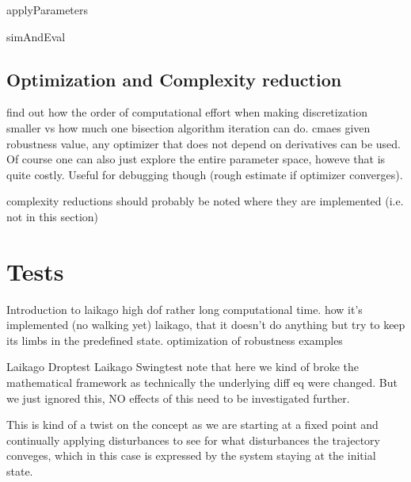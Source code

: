     applyParameters

    simAndEval

\subsection{Optimization and Complexity reduction}
    

    find out how the order of computational effort when making discretization smaller vs how much one bisection algorithm iteration can do. 
    cmaes
    given robustness value, any optimizer that does not depend on derivatives can be used. 
    Of course one can also just explore the entire parameter space, howeve that is quite costly. Useful for debugging though (rough estimate if optimizer converges).

    complexity reductions should probably be noted where they are implemented (i.e. not in this section)

\section{Tests}


    Introduction to laikago
        high dof
        rather long computational time. 
        how it's implemented (no walking yet) laikago, that it doesn't do anything but try to keep its limbs in the predefined state.  
    optimization of robustness examples

    Laikago Droptest
    Laikago Swingtest
        note that here we kind of broke the mathematical framework as technically the underlying diff eq were changed. But we just ignored this, NO effects of this need to be investigated further. 

    This is kind of a twist on the concept as we are starting at a fixed point and continually applying disturbances to see for what disturbances the trajectory conveges, which in this case is expressed by the system staying at the initial state. 
